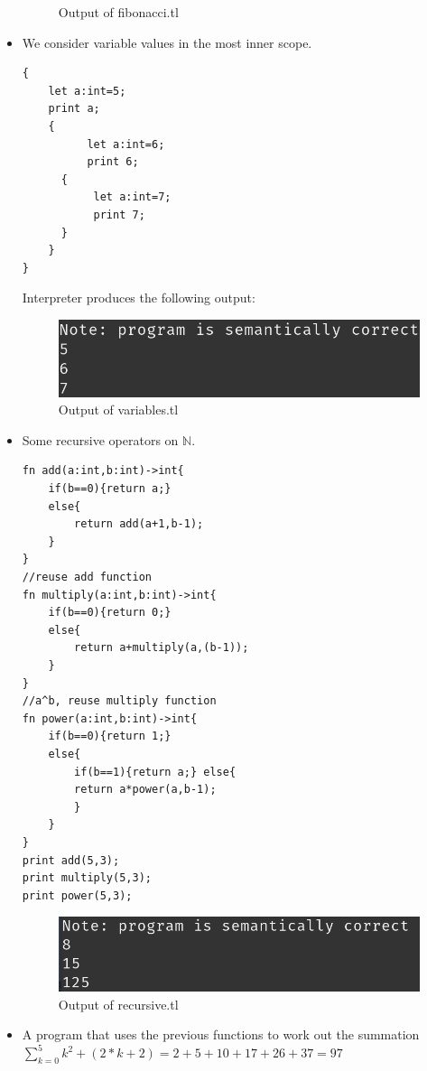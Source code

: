 \begin{itemize}
\begin{figure}[H]
    \caption{Output of fibonacci.tl}
    \label{fig:output fibonacci}
\end{figure}
\item We consider variable values in the most inner scope.
\begin{lstlisting}[basicstyle=\tiny,caption=variables variables.tl]
{
    let a:int=5;
    print a;
    {
          let a:int=6;
          print 6;
	  {
	       let a:int=7;
	       print 7;
	  }
    }
}
\end{lstlisting}
Interpreter produces the following output:
\begin{figure}[H]
    \centering
    \includegraphics[scale=0.8]{Task345/images/variables-output.png}
    \caption{Output of variables.tl}
    \label{fig:output fibonacci}
\end{figure}
\item Some recursive operators on $\mathbb{N}$.
\begin{lstlisting}[basicstyle=\tiny,caption= recursive.tl]
fn add(a:int,b:int)->int{
    if(b==0){return a;}
    else{
    	return add(a+1,b-1);
    }
}
//reuse add function
fn multiply(a:int,b:int)->int{
    if(b==0){return 0;}
    else{
    	return a+multiply(a,(b-1));
    }
}
//a^b, reuse multiply function
fn power(a:int,b:int)->int{
    if(b==0){return 1;}
    else{
    	if(b==1){return a;} else{
    	return a*power(a,b-1);
    	}
    }
}
print add(5,3);
print multiply(5,3);
print power(5,3);
\end{lstlisting}
\begin{figure}[H]
    \centering
    \includegraphics[scale=0.8]{Task345/images/recursive.png}
    \caption{Output of recursive.tl}
    \label{fig:output fibonacci}
\end{figure}
\item A program that uses the previous functions to work out the summation $\sum\limits_{k=0}^{5} k^2+(2*k+2)=2+5+10+17+26+37=97 $



\end{itemize}
